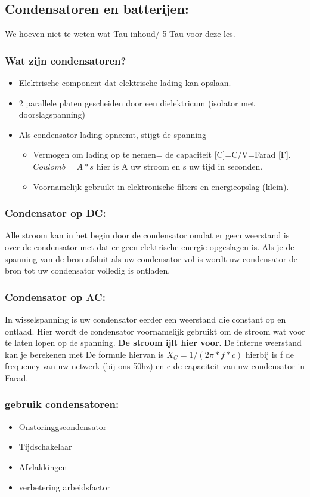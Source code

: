 \documentclass[12pt]{article}
\begin{document}
\subsection{Condensatoren en batterijen:}
We hoeven niet te weten wat Tau inhoud/ 5 Tau voor deze les.
\subsubsection{Wat zijn condensatoren?}
\begin{itemize}
    \item Elektrische component dat elektrische lading kan opslaan.
    \item 2 parallele platen gescheiden door een dielektricum (isolator met doorslagspanning)
    \item Als condensator lading opneemt, stijgt de spanning\begin{itemize}
        \item Vermogen om lading op te nemen= de capaciteit [C]=C/V=Farad [F]. $Coulomb= A*s$ hier is A uw stroom en s uw tijd in seconden.
    \item Voornamelijk gebruikt in elektronische filters en energieopslag (klein).
    \end{itemize}
\end{itemize}
\subsubsection{Condensator op DC:}
Alle stroom kan in het begin door de condensator omdat er geen weerstand is over de condensator met dat er geen elektrische energie opgeslagen is.
Als je de spanning van de bron afsluit als uw condensator vol is wordt uw condensator de bron tot uw condensator volledig is ontladen.
\subsubsection{Condensator op AC:}
In wisselspanning is uw condensator eerder een weerstand die constant op en ontlaad. Hier wordt de condensator voornamelijk gebruikt om de stroom wat voor te laten lopen op de spanning. \textbf{De stroom ijlt hier voor}. De interne weerstand kan je berekenen met De formule hiervan is $X_C=1/(2\pi*f*c)$ hierbij is f de frequency van uw netwerk (bij ons 50hz) en c de capaciteit van uw condensator in Farad.
\subsubsection{gebruik condensatoren:}
\begin{itemize}
    \item Onstoringgscondensator
    \item Tijdschakelaar
    \item Afvlakkingen
    \item verbetering arbeidsfactor
\end{itemize}
\end{document}
